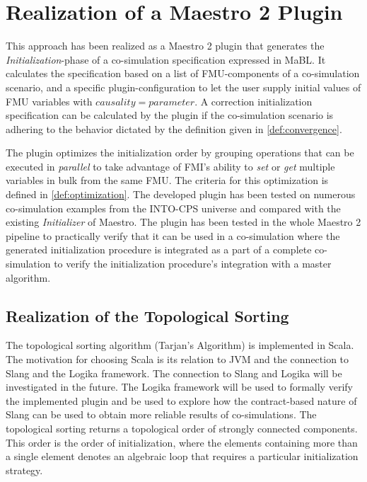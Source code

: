 \section{Realization of a Maestro 2 Plugin}\label{sc:implementation}
This approach has been realized as a Maestro 2 plugin that generates the \textit{Initialization}-phase of a co-simulation specification expressed in MaBL. It calculates the specification based on a list of FMU-components of a co-simulation scenario, and a specific plugin-configuration to let the user supply initial values of FMU variables with $causality=parameter$. A correction initialization specification can be calculated by the plugin if the co-simulation scenario is adhering to the behavior dictated by the definition given in \cref{def:convergence}.

The plugin optimizes the initialization order by grouping operations that can be executed in \textit{parallel} to take advantage of FMI's ability to \textit{set} or \textit{get} multiple variables in bulk from the same FMU. The criteria for this optimization is defined in \cref{def:optimization}. 
The developed plugin has been tested on numerous co-simulation examples from the INTO-CPS universe\cite{Maestro} and compared with the existing \textit{Initializer} of Maestro. The plugin has been tested in the whole Maestro 2 pipeline to practically verify that it can be used in a co-simulation where the generated initialization procedure is integrated as a part of a complete co-simulation to verify the initialization procedure's integration with a master algorithm.

\subsection{Realization of the Topological Sorting}
The topological sorting algorithm (Tarjan's Algorithm) is implemented in Scala. The motivation for choosing Scala is its relation to JVM and the connection to Slang and the Logika framework\cite{inbook}. The connection to Slang and Logika will be investigated in the future. The Logika framework will be used to formally verify the implemented plugin and be used to explore how the contract-based nature of Slang can be used to obtain more reliable results of co-simulations. The topological sorting returns a topological order of strongly connected components. This order is the order of initialization, where the elements containing more than a single element denotes an algebraic loop that requires a particular initialization strategy. 

